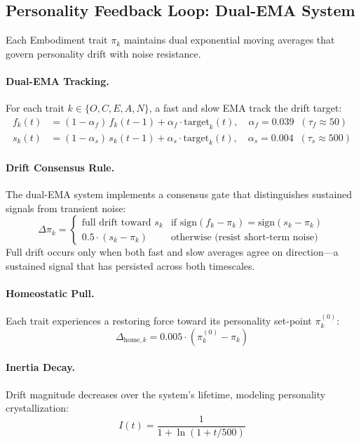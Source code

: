 \documentclass[11pt]{article}
\begin{document}
\subsection{Personality Feedback Loop: Dual-EMA System}
\label{sec:personality-feedback}

Each Embodiment trait $\pi_k$ maintains dual exponential moving averages that govern personality drift with noise resistance.

\paragraph{Dual-EMA Tracking.}
For each trait $k \in \{O, C, E, A, N\}$, a fast and slow EMA track the drift target:
\begin{align}
f_k(t) &= (1 - \alpha_f)\, f_k(t-1) + \alpha_f \cdot \text{target}_k(t), \quad \alpha_f = 0.039 \;\;(\tau_f \approx 50) \\
s_k(t) &= (1 - \alpha_s)\, s_k(t-1) + \alpha_s \cdot \text{target}_k(t), \quad \alpha_s = 0.004 \;\;(\tau_s \approx 500)
\end{align}

\paragraph{Drift Consensus Rule.}
The dual-EMA system implements a consensus gate that distinguishes sustained signals from transient noise:
\begin{equation}
\Delta\pi_k = \begin{cases}
\text{full drift toward } s_k & \text{if } \text{sign}(f_k - \pi_k) = \text{sign}(s_k - \pi_k) \\
0.5 \cdot (s_k - \pi_k) & \text{otherwise (resist short-term noise)}
\end{cases}
\end{equation}
Full drift occurs only when both fast and slow averages agree on direction---a sustained signal that has persisted across both timescales.

\paragraph{Homeostatic Pull.}
Each trait experiences a restoring force toward its personality set-point $\pi_k^{(0)}$:
\begin{equation}
\Delta_{\text{home},k} = 0.005 \cdot (\pi_k^{(0)} - \pi_k)
\end{equation}

\paragraph{Inertia Decay.}
Drift magnitude decreases over the system's lifetime, modeling personality crystallization:
\begin{equation}
I(t) = \frac{1}{1 + \ln(1 + t/500)}
\end{equation}
\end{document}
